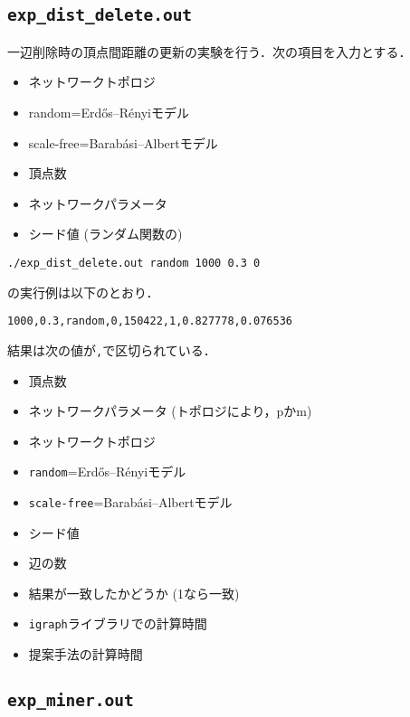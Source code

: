 \subsection*{\texorpdfstring{\texttt{exp\_dist\_delete.out}}{exp\_dist\_delete.out}}\label{expux5fdistux5fdelete.out}

一辺削除時の頂点間距離の更新の実験を行う．次の項目を入力とする．

\begin{itemize}
\tightlist
\item
  ネットワークトポロジ
\item
  random=Erd\H{o}s--R{\'e}nyiモデル
\item
  scale-free=Barab{\'a}si--Albertモデル
\item
  頂点数
\item
  ネットワークパラメータ
\item
  シード値 (ランダム関数の)
\end{itemize}

\begin{verbatim}
./exp_dist_delete.out random 1000 0.3 0
\end{verbatim}

の実行例は以下のとおり．

\begin{verbatim}
1000,0.3,random,0,150422,1,0.827778,0.076536
\end{verbatim}

結果は次の値が\texttt{,}で区切られている．

\begin{itemize}
\tightlist
\item
  頂点数
\item
  ネットワークパラメータ (トポロジにより，pかm)
\item
  ネットワークトポロジ
\item
  \texttt{random}=Erd\H{o}s--R{\'e}nyiモデル
\item
  \texttt{scale-free}=Barab{\'a}si--Albertモデル
\item
  シード値
\item
  辺の数
\item
  結果が一致したかどうか (1なら一致)
\item
  \texttt{igraph}ライブラリでの計算時間
\item
  提案手法の計算時間
\end{itemize}

\subsection*{\texorpdfstring{\texttt{exp\_miner.out}}{exp\_miner.out}}\label{expux5fminer.out}

